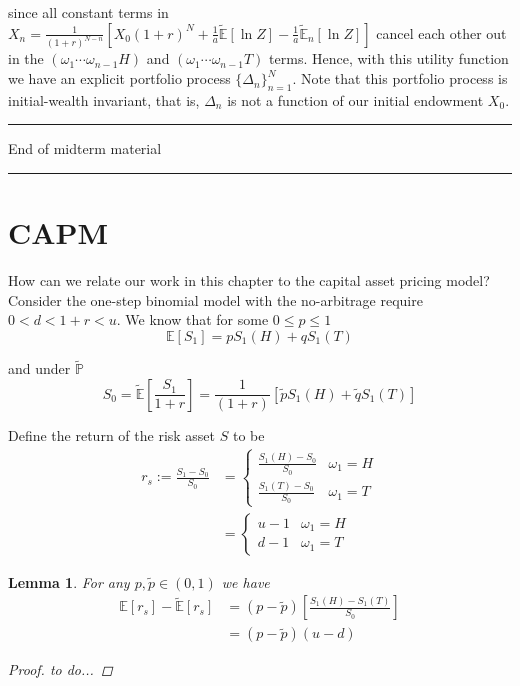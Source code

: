 \documentclass[12pt]{article}
\newtheorem{lemma}{Lemma}
\newlength\tindent
\renewcommand{\indent}{\hspace*{\tindent}}
\renewcommand{\P}{\mathbb P}
\newcommand{\E}{\mathbb E}
\begin{document}
since all constant terms in $X_n = \frac{1}{(1 + r)^{N - n}} \left[ X_0(1 + r)^N + \frac{1}{a} \tilde{\E}[\ln Z] - \frac{1}{a} \tilde{\E}_n [\ln Z] \right]$ cancel each other out in the $(\omega_1\cdots\omega_{n - 1}H)$ and $(\omega_1\cdots\omega_{n - 1}T)$ terms. Hence, with this utility function we have an explicit portfolio process $\{\Delta_n\}^N_{n = 1}$. Note that this portfolio process is initial-wealth invariant, that is, $\Delta_n$ is not a function of our initial endowment $X_0$.

\begin{center}
\rule{\textwidth}{0.5pt}
	End of midterm material
\rule{\textwidth}{0.5pt}
\end{center}

\section{CAPM}

\indent How can we relate our work in this chapter to the capital asset pricing model? Consider the one-step binomial model with the no-arbitrage require $0 < d < 1 + r < u$. We know that for some $0 \leq p \leq 1$
\begin{equation*}
	\E[S_1] = pS_1(H) + qS_1(T)
\end{equation*}

and under $\tilde{\P}$
\begin{equation*}
	S_0 = \tilde{\E} \left[ \frac{S_1}{1 + r} \right] = \frac{1}{(1 + r)} \left[ \tilde{p} S_1(H) + \tilde{q}S_1(T) \right]
\end{equation*}

Define the return of the risk asset $S$ to be
\begin{align*}
	r_s := \frac{S_1 - S_0}{S_0} &= 
		\begin{cases}
			\frac{ S_1(H) - S_0 }{S_0} & \omega_1 = H \\
			\frac{ S_1(T) - S_0 }{S_0} & \omega_1 = T
		\end{cases} \\
		&=
		\begin{cases}
			u - 1 & \omega_1 = H \\
			d - 1 & \omega_1 = T
		\end{cases}
\end{align*}

\begin{lemma} For any $p, \tilde{p} \in (0, 1)$ we have
\begin{align*}
	\E[r_s] - \tilde{\E}[r_s] &= (p - \tilde{p})\left[ \frac{S_1(H) - S_1(T)}{S_0} \right] \\
	&= (p - \tilde{p})(u - d)
\end{align*}

\begin{proof} to do...
\end{proof}
\end{lemma}
\end{document}

